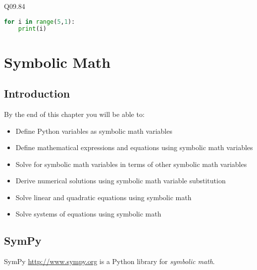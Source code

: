 \documentclass{book}
\begin{document}
Q09.84

\begin{lstlisting}[language=Python]
for i in range(5,1):
    print(i)
\end{lstlisting}
    




    
        \hypertarget{symbolic-math}{%
\chapter{Symbolic Math}\label{symbolic-math}}
    




    
        \hypertarget{introduction}{%
\section{Introduction}\label{introduction}}
    




    
        By the end of this chapter you will be able to:

\begin{itemize}
\item
  Define Python variables as symbolic math variables
\item
  Define mathematical expressions and equations using symbolic math
  variables
\item
  Solve for symbolic math variables in terms of other symbolic math
  variables
\item
  Derive numerical solutions using symbolic math variable substitution
\item
  Solve linear and quadratic equations using symbolic math
\item
  Solve systems of equations using symbolic math
\end{itemize}
        \newpage

    




    
        \hypertarget{sympy}{%
\section{SymPy}\label{sympy}}
    




    
        SymPy \url{http://www.sympy.org} is a Python library for \emph{symbolic
math}.
\end{document}
